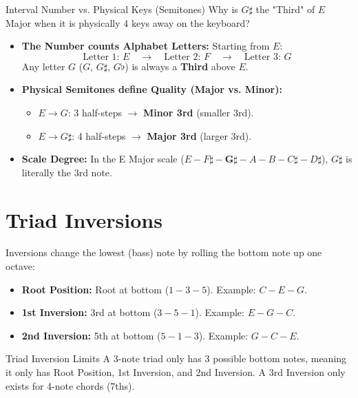 \begin{definitionbox}{Interval Number vs. Physical Keys (Semitones)}
Why is $G\sharp$ the "Third" of $E$ Major when it is physically 4 keys away on the keyboard?
\begin{itemize}
    \item \textbf{The Number counts Alphabet Letters:} Starting from $E$:
    \begin{equation*}
        \text{Letter 1: } E \quad\longrightarrow\quad \text{Letter 2: } F \quad\longrightarrow\quad \text{Letter 3: } G
    \end{equation*}
    Any letter $G$ ($G$, $G\sharp$, $G\flat$) is always a \textbf{Third} above $E$.
    \item \textbf{Physical Semitones define Quality (Major vs. Minor):}
    \begin{itemize}
        \item $E \rightarrow G$: 3 half-steps $\longrightarrow$ \textbf{Minor 3rd} (smaller 3rd).
        \item $E \rightarrow G\sharp$: 4 half-steps $\longrightarrow$ \textbf{Major 3rd} (larger 3rd).
    \end{itemize}
    \item \textbf{Scale Degree:} In the E Major scale ($E - F\sharp - \mathbf{G\sharp} - A - B - C\sharp - D\sharp$), $G\sharp$ is literally the 3rd note.
\end{itemize}
\end{definitionbox}

\section{Triad Inversions}

Inversions change the lowest (bass) note by rolling the bottom note up one octave:

\begin{itemize}
    \item \textbf{Root Position:} Root at bottom ($1 - 3 - 5$). Example: $C - E - G$.
    \item \textbf{1st Inversion:} 3rd at bottom ($3 - 5 - 1$). Example: $E - G - C$.
    \item \textbf{2nd Inversion:} 5th at bottom ($5 - 1 - 3$). Example: $G - C - E$.
\end{itemize}

\begin{warningbox}{Triad Inversion Limits}
A 3-note triad only has 3 possible bottom notes, meaning it only has Root Position, 1st Inversion, and 2nd Inversion. A 3rd Inversion only exists for 4-note chords (7ths).
\end{warningbox}

